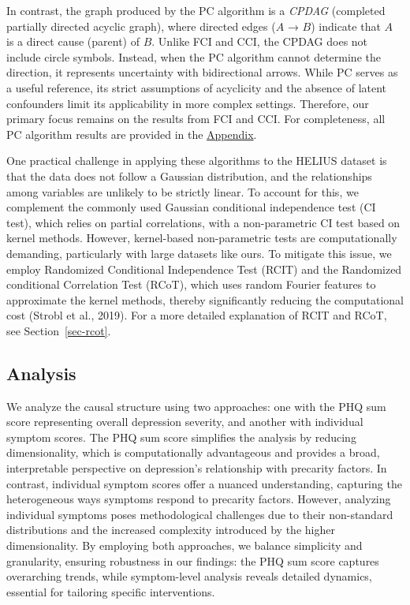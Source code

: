 \documentclass[
]{article}
\begin{document}
In contrast, the graph produced by the PC algorithm is a \emph{CPDAG}
(completed partially directed acyclic graph), where directed edges
(\(A\) → \(B\)) indicate that \(A\) is a direct cause (parent) of \(B\).
Unlike FCI and CCI, the CPDAG does not include circle symbols. Instead,
when the PC algorithm cannot determine the direction, it represents
uncertainty with bidirectional arrows. While PC serves as a useful
reference, its strict assumptions of acyclicity and the absence of
latent confounders limit its applicability in more complex settings.
Therefore, our primary focus remains on the results from FCI and CCI.
For completeness, all PC algorithm results are provided in the
\hyperref[sec-appendix]{Appendix}.

One practical challenge in applying these algorithms to the HELIUS
dataset is that the data does not follow a Gaussian distribution, and
the relationships among variables are unlikely to be strictly linear. To
account for this, we complement the commonly used Gaussian conditional
independence test (CI test), which relies on partial correlations, with
a non-parametric CI test based on kernel methods. However, kernel-based
non-parametric tests are computationally demanding, particularly with
large datasets like ours. To mitigate this issue, we employ Randomized
Conditional Independence Test (RCIT) and the Randomized conditional
Correlation Test (RCoT), which uses random Fourier features to
approximate the kernel methods, thereby significantly reducing the
computational cost (Strobl et al., 2019). For a more detailed
explanation of RCIT and RCoT, see Section~\ref{sec-rcot}.

\subsection{Analysis}\label{analysis}

We analyze the causal structure using two approaches: one with the PHQ
sum score representing overall depression severity, and another with
individual symptom scores. The PHQ sum score simplifies the analysis by
reducing dimensionality, which is computationally advantageous and
provides a broad, interpretable perspective on depression's relationship
with precarity factors. In contrast, individual symptom scores offer a
nuanced understanding, capturing the heterogeneous ways symptoms respond
to precarity factors. However, analyzing individual symptoms poses
methodological challenges due to their non-standard distributions and
the increased complexity introduced by the higher dimensionality. By
employing both approaches, we balance simplicity and granularity,
ensuring robustness in our findings: the PHQ sum score captures
overarching trends, while symptom-level analysis reveals detailed
dynamics, essential for tailoring specific interventions.
\end{document}
